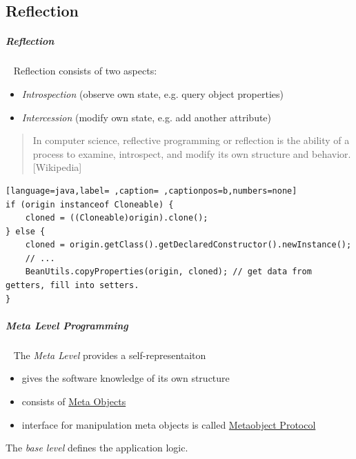 \documentclass[11pt,twoside,landscape]{article}
\begin{document}
\begin{multicols}{3}
\section{Reflection}
\label{sec:orgb67cd5d}
\subparagraph{Reflection} \
\label{sec:org3438860}
Reflection consists of two aspects:
\begin{itemize}
\item \emph{Introspection} (observe own state, e.g. query object properties)
\item \emph{Intercession} (modify own state, e.g. add another attribute)
\end{itemize}

\begin{quote}
In computer science, reflective programming or reflection is the ability of a process to examine, introspect, and modify its own structure and behavior. [Wikipedia]
\end{quote}


\begin{lstlisting}[language=java,label= ,caption= ,captionpos=b,numbers=none]
if (origin instanceof Cloneable) {
    cloned = ((Cloneable)origin).clone();
} else {
    cloned = origin.getClass().getDeclaredConstructor().newInstance();
    // ...
    BeanUtils.copyProperties(origin, cloned); // get data from getters, fill into setters.
}
\end{lstlisting}
\subparagraph{Meta Level Programming} \
\label{sec:org8981247}
The \emph{Meta Level} provides a self-representaiton
\begin{itemize}
\item gives the software knowledge of its own structure
\item consists of \href{../../../roam/20230115160536-what_are_meta_objects.org}{Meta Objects}
\item interface for manipulation meta objects is called \href{../../../roam/20230115160651-what_is_the_metaobject_protocol.org}{Metaobject Protocol}
\end{itemize}


The \emph{base level} defines the application logic.


\end{multicols}
\end{document}
